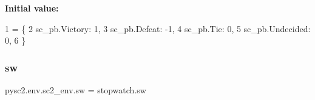{\bfseries Initial value\+:}
\begin{DoxyCode}
1 =  \{
2     sc\_pb.Victory: 1,
3     sc\_pb.Defeat: -1,
4     sc\_pb.Tie: 0,
5     sc\_pb.Undecided: 0,
6 \}
\end{DoxyCode}
\mbox{\label{namespacepysc2_1_1env_1_1sc2__env_a841ede07ac5c57ba50d466779e15be0d}} 
\subsubsection{\texorpdfstring{sw}{sw}}
{\footnotesize\ttfamily pysc2.\+env.\+sc2\+\_\+env.\+sw = stopwatch.\+sw}

